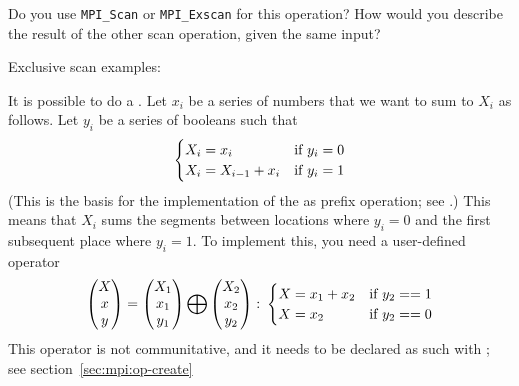 \begin{exercise}
  Do you use \lstinline$MPI_Scan$ or \lstinline$MPI_Exscan$ for this operation? How
  would you describe the result of the other scan operation, given the
  same input?
\end{exercise}

Exclusive scan examples:
%
%

It is possible to do a . Let $x_i$ be a series of numbers
that we want to sum to $X_i$ as follows. Let $y_i$ be a series of booleans such that
\[ 
\begin{cases}
  X_i=x_i&\hbox{if $y_i=0$}\\
  X_i=X_{i-1}+x_i&\hbox{if $y_i=1$}
\end{cases}
\]
(This is the basis for the implementation of the 
as prefix operation; see .)
This means that $X_i$ sums the segments between locations where $y_i=0$ and the
first subsequent place where $y_i=1$. To implement this, you need a user-defined operator
\[ 
\begin{pmatrix}  X\\ x\\ y\end{pmatrix}
=
\begin{pmatrix}  X_1\\ x_1\\ y_1\end{pmatrix}
\bigoplus
\begin{pmatrix}  X_2\\ x_2\\ y_2\end{pmatrix}\colon
  \begin{cases}
    X=x_1+x_2&\hbox{if $y_2==1$}\\ X=x_2&\hbox{if $y_2==0$}
  \end{cases}
\]
This operator is not communitative, and it needs to be declared as such
with ; see section~\ref{sec:mpi:op-create}


